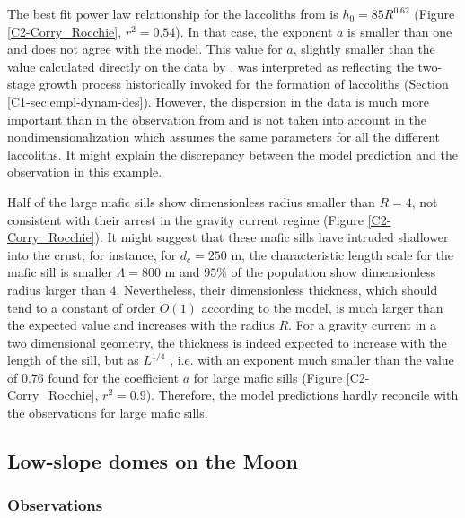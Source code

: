The  best  fit   power  law  relationship  for   the  laccoliths  from
\citet{E:2015tl}     is     $h_0     =    85     R^{0.62}$     (Figure
\ref{C2-Corry_Rocchie}, $r^2  =0.54$). In that case,  the exponent $a$
is smaller than one and does not agree with the model.  This value for
$a$, slightly smaller  than the value calculated directly  on the data
by  \citet{McCaffrey:1997ea},   was  interpreted  as   reflecting  the
two-stage  growth process  historically invoked  for the  formation of
laccoliths   (Section   \ref{C1-sec:empl-dynam-des}).   However,   the
dispersion in the data is much  more important than in the observation
from  \citet{Rocchi:2010dn}  and is  not  taken  into account  in  the
nondimensionalization which  assumes the  same parameters for  all the
different  laccoliths. It  might explain  the discrepancy  between the
model prediction and the observation in this example.

Half of the  large mafic sills show dimensionless  radius smaller than
$R=4$, not consistent with their  arrest in the gravity current regime
(Figure \ref{C2-Corry_Rocchie}).   It might  suggest that  these mafic
sills  have  intruded shallower  into  the  crust; for  instance,  for
$d_c=250$ m,  the characteristic  length scale for  the mafic  sill is
smaller   $\Lambda=800$  m   and   $95\%$  of   the  population   show
dimensionless   radius   larger   than   $4$.    Nevertheless,   their
dimensionless  thickness, which  should tend  to a  constant of  order
$O(1)$ according to the model, is  much larger than the expected value
and increases  with the radius  $R$.  For a  gravity current in  a two
dimensional  geometry, the  thickness is  indeed expected  to increase
with the length of the  sill, but as $L^{1/4}$ \citep{Michaut:2011kg},
i.e. with an exponent much smaller  than the value of $0.76$ found for
the    coefficient    $a$    for    large    mafic    sills    (Figure
\ref{C2-Corry_Rocchie}, $r^2=0.9$).  Therefore,  the model predictions
hardly reconcile with the observations for large mafic sills.


\subsection{Low-slope domes on the Moon}
\label{C2-sec:observ-vs-pred}

\subsubsection*{Observations}


